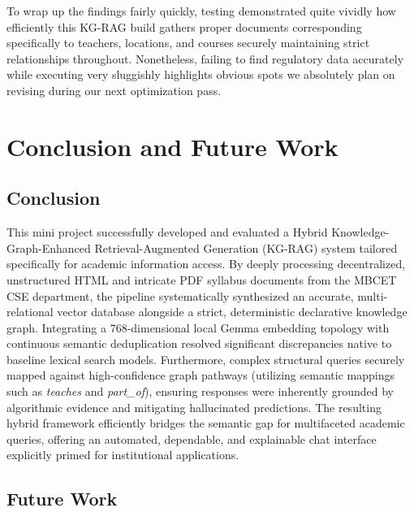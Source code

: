 \documentclass[12pt,a4paper]{report}
\begin{document}
To wrap up the findings fairly quickly, testing demonstrated quite vividly how efficiently this KG-RAG build gathers proper documents corresponding specifically to teachers, locations, and courses securely maintaining strict relationships throughout. Nonetheless, failing to find regulatory data accurately while executing very sluggishly highlights obvious spots we absolutely plan on revising during our next optimization pass.

\clearpage

\chapter{Conclusion and Future Work}

\section{Conclusion}

This mini project successfully developed and evaluated a Hybrid Knowledge-Graph-Enhanced Retrieval-Augmented Generation (KG-RAG) system tailored specifically for academic information access. By deeply processing decentralized, unstructured HTML and intricate PDF syllabus documents from the MBCET CSE department, the pipeline systematically synthesized an accurate, multi-relational vector database alongside a strict, deterministic declarative knowledge graph. Integrating a 768-dimensional local Gemma embedding topology with continuous semantic deduplication resolved significant discrepancies native to baseline lexical search models. Furthermore, complex structural queries securely mapped against high-confidence graph pathways (utilizing semantic mappings such as \textit{teaches} and \textit{part\_of}), ensuring responses were inherently grounded by algorithmic evidence and mitigating hallucinated predictions. The resulting hybrid framework efficiently bridges the semantic gap for multifaceted academic queries, offering an automated, dependable, and explainable chat interface explicitly primed for institutional applications.

\section{Future Work}
\end{document}
